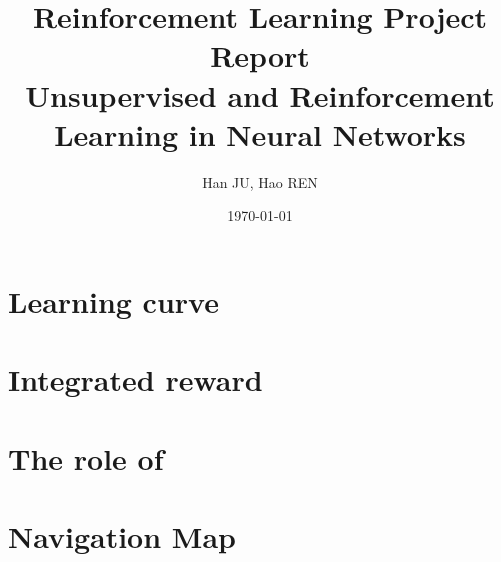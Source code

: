 \documentclass[a4paper, 12pt]{article}
\title{Reinforcement Learning Project Report \\ \vspace{0.5cm} \large Unsupervised and Reinforcement Learning in Neural Networks}
\author{Han JU, Hao REN}
\date{\today}
\begin{document}
\maketitle
\section{Learning curve}
\section{Integrated reward}
\section{The role of \epsilon}
\section{Navigation Map}
\end{document}
